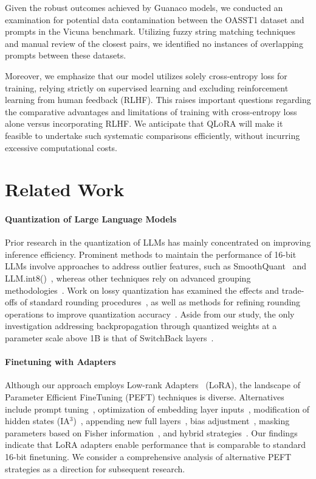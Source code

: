Given the robust outcomes achieved by {Guanaco} models, we conducted an examination for potential data contamination between the OASST1 dataset and prompts in the Vicuna benchmark. Utilizing fuzzy string matching techniques and manual review of the closest pairs, we identified no instances of overlapping prompts between these datasets.

Moreover, we emphasize that our model utilizes solely cross-entropy loss for training, relying strictly on supervised learning and excluding reinforcement learning from human feedback (RLHF). This raises important questions regarding the comparative advantages and limitations of training with cross-entropy loss alone versus incorporating RLHF. We anticipate that \textsc{QLoRA} will make it feasible to undertake such systematic comparisons efficiently, without incurring excessive computational costs.

\section{Related Work}

\paragraph{Quantization of Large Language Models} Prior research in the quantization of LLMs has mainly concentrated on improving inference efficiency. Prominent methods to maintain the performance of 16-bit LLMs involve approaches to address outlier features, such as SmoothQuant~\citep{xiao2022smoothquant} and LLM.int8()~\citep{dettmers2022llm}, whereas other techniques rely on advanced grouping methodologies~\citep{park2022nuqmm, yao2022zeroquant}. Work on lossy quantization has examined the effects and trade-offs of standard rounding procedures~\citep{dettmers2022case,zeng2022glm,pope2022efficiently}, as well as methods for refining rounding operations to improve quantization accuracy~\citep{frantar2022gptq}. Aside from our study, the only investigation addressing backpropagation through quantized weights at a parameter scale above 1B is that of SwitchBack layers~\citep{wortsman2023stable}.

\paragraph{Finetuning with Adapters} Although our approach employs Low-rank Adapters~\citep{hu2021lora} (LoRA), the landscape of Parameter Efficient FineTuning (PEFT) techniques is diverse. Alternatives include prompt tuning~\citep{qin2021learning,lester2021power,li2021prefix}, optimization of embedding layer inputs~\citep{an2022input}, modification of hidden states (IA$^3$)~\citep{liu2022few}, appending new full layers~\citep{houlsby2019parameter}, bias adjustment~\citep{zaken2021bitfit}, masking parameters based on Fisher information~\citep{sung2021training}, and hybrid strategies~\citep{henderson2021compacter}. Our findings indicate that LoRA adapters enable performance that is comparable to standard 16-bit finetuning. We consider a comprehensive analysis of alternative PEFT strategies as a direction for subsequent research.

